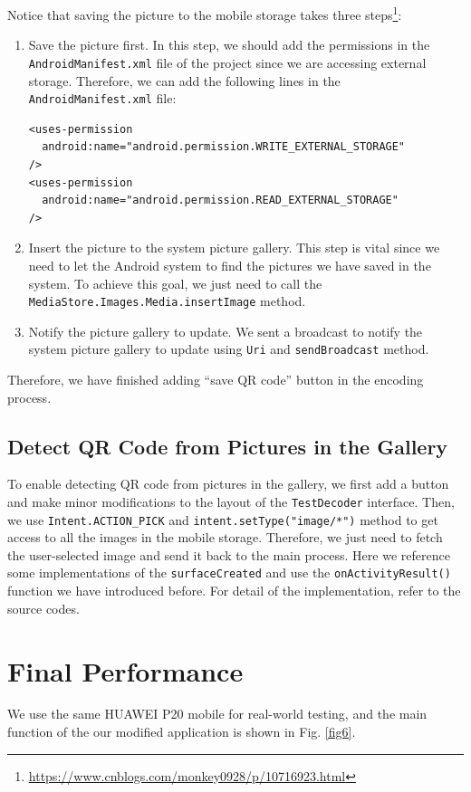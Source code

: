 \documentclass[12pt, a4paper]{article}
\theoremstyle{definition}
\begin{document}
Notice that saving the picture to the mobile storage takes three steps\footnote{\href{https://www.cnblogs.com/monkey0928/p/10716923.html}{https://www.cnblogs.com/monkey0928/p/10716923.html}}:
\begin{enumerate}
\item Save the picture first. In this step, we should add the permissions in the \texttt{AndroidManifest.xml} file of the project since we are accessing external storage. Therefore, we can add the following lines in the \texttt{AndroidManifest.xml} file:
\begin{lstlisting}
<uses-permission 
  android:name="android.permission.WRITE_EXTERNAL_STORAGE" 
/>
<uses-permission
  android:name="android.permission.READ_EXTERNAL_STORAGE" 
/>
\end{lstlisting}
\item Insert the picture to the system picture gallery. This step is vital since we need to let the Android system to find the pictures we have saved in the system. To achieve this goal, we just need to call the \texttt{MediaStore.Images.Media.insertImage} method.
\item Notify the picture gallery to update. We sent a broadcast to notify the system picture gallery to update using \texttt{Uri} and \texttt{sendBroadcast} method.
\end{enumerate}

Therefore, we have finished adding ``save QR code'' button in the encoding process.

\subsection{Detect QR Code from Pictures in the Gallery}
To enable detecting QR code from pictures in the gallery, we first add a button and make minor modifications to the layout of the \texttt{TestDecoder} interface. Then, we use \texttt{Intent.ACTION\_PICK} and \texttt{intent.setType("image/*")} method to get access to all the images in the mobile storage. Therefore, we just need to fetch the user-selected image and send it back to the main process. Here we reference some implementations of the \texttt{surfaceCreated} and use the \texttt{onActivityResult()} function we have introduced before. For detail of the implementation, refer to the source codes.

\section{Final Performance}
We use the same HUAWEI P20 mobile for real-world testing, and the main function of the our modified application is shown in Fig. \ref{fig6}.
\end{document}
